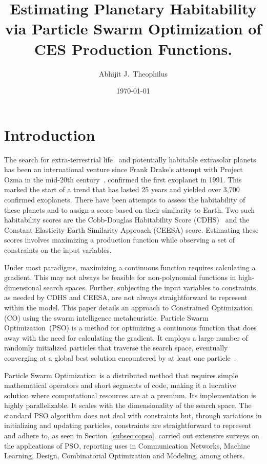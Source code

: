 \documentclass[10pt]{article}
\title{Estimating Planetary Habitability via Particle Swarm Optimization of CES Production Functions.}
\author{Abhijit J.\ Theophilus}
\date{\today}
\newcommand{\pso}{Particle Swarm Optimization}
\begin{document}
\maketitle


\section{Introduction}\label{sec:intro}

The search for extra-terrestrial life~\cite{Seth1,Biosig} and potentially habitable extrasolar
planets~\cite{Kepler,Presto} has been an international venture since Frank Drake's attempt with Project Ozma in the
mid-20th century~\cite{Ozma}. \textcite{Exo1} confirmed the first exoplanet in 1991. This marked the start of a trend
that has lasted 25 years and yielded over 3,700 confirmed exoplanets. There have been attempts to assess the
habitability of these planets and to assign a score based on their similarity to Earth. Two such habitability scores are
the Cobb-Douglas Habitability Score (CDHS)~\cite{Bora,Saha} and the Constant Elasticity Earth Similarity Approach
(CEESA) score. Estimating these scores involves maximizing a production function while observing a set of constraints on
the input variables.

Under most paradigms, maximizing a continuous function requires calculating a gradient. This may not always be feasible
for non-polynomial functions in high-dimensional search spaces. Further, subjecting the input variables to constraints,
as needed by CDHS and CEESA, are not always straightforward to represent within the model. This paper details an
approach to Constrained Optimization (CO) using the swarm intelligence metaheuristic. \pso\ (PSO) is a method for
optimizing a continuous function that does away with the need for calculating the gradient. It employs a large number of
randomly initialized particles that traverse the search space, eventually converging at a global best solution
encountered by at least one particle~\cite{PSO1,PSO2}.

\pso\ is a distributed method that requires simple mathematical operators and short segments of code, making it a
lucrative solution where computational resources are at a premium. Its implementation is highly parallelizable. It
scales with the dimensionality of the search space. The standard PSO algorithm does not deal with constraints but,
through variations in initializing and updating particles, constraints are straightforward to represent and adhere to,
as seen in Section~\ref{subsec:copso}. \textcite{Poli1,Poli2} carried out extensive surveys on the applications of PSO,
reporting uses in Communication Networks, Machine Learning, Design, Combinatorial Optimization and Modeling, among
others.
\end{document}
